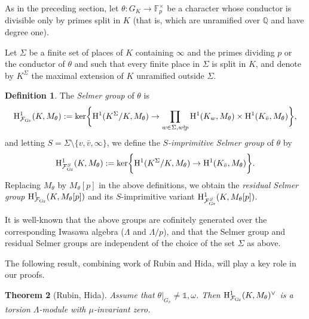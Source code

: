 \documentclass[10pt]{amsart}
\numberwithin{equation}{section}
\newtheorem{theorem}{Theorem}
\theoremstyle{definition}
\newtheorem{definition}[theorem]{Definition}
\theoremstyle{remark}
\newcommand{\Fcal}{\mathcal{F}}
\newcommand{\Q}{\mathbb{Q}}
\newcommand{\rH}{\mathrm{H}}
\begin{document}
As in the preceding section, let $\theta:G_K\rightarrow\mathbb{F}_p^\times$ be a character whose conductor is divisible only by primes split in $K$ (that is, which are unramified over $\Q$ and have degree one).

Let $\Sigma$ be a finite set of places of $K$ containing $\infty$ and the primes dividing $p$ or the conductor of $\theta$
and such that every finite place in $\Sigma$ is split in $K$, and denote by $K^\Sigma$ the maximal extension of $K$ unramified outside $\Sigma$. 

\begin{definition} 
The \emph{Selmer group} of $\theta$ is
\[
\rH^1_{\Fcal_{\rm Gr}}(K,M_\theta):=\ker\biggr\{\rH^1(K^\Sigma/K,M_\theta)\rightarrow\prod_{w \in \Sigma, w \nmid p}\rH^1(K_w,M_\theta)\times\rH^1(K_{\bar{v}},M_\theta)\biggr\},
\]
and letting $S=\Sigma\setminus\{v,\bar{v},\infty\}$, we define the \emph{$S$-imprimitive Selmer group} of $\theta$ by 
\[
\rH^1_{\Fcal_{\rm Gr}^S}(K,M_\theta):=\ker\biggr\{\rH^1(K^\Sigma/K,M_\theta)\rightarrow\rH^1(K_{\bar{v}},M_\theta)\biggr\}.
\]
Replacing $M_\theta$ by $M_\theta[p]$ in the above definitions, we obtain the \emph{residual Selmer group} $\rH^1_{\Fcal_{\rm Gr}}(K,M_\theta[p])$ and its $S$-imprimitive variant $\rH^1_{\Fcal_{\rm Gr}^S}(K,M_\theta[p])$.
\end{definition}

It is well-known that the above  groups are cofinitely generated over the corresponding Iwasawa algebra ($\Lambda$ and $\Lambda/p$), and that the Selmer group and residual Selmer groups 
are independent of the choice of the set $\Sigma$ as above. 


The following result, combining work of Rubin  
and Hida, will play a key role in our proofs.

\begin{theorem}[Rubin, Hida]\label{thmmu=0} 
Assume that $\theta\vert_{G_{\bar{v}}}\neq\mathds{1},\omega$. Then $\rH^1_{\Fcal_{\rm Gr}}(K,M_\theta)^\vee$ is a torsion $\Lambda$-module with $\mu$-invariant zero.
\end{theorem}
\end{document}
